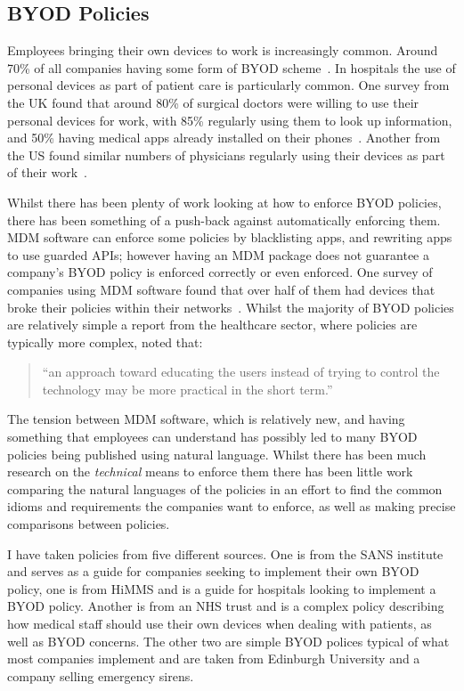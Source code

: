 \documentclass[a4paper]{scrartcl}
\begin{document}
\subsection{BYOD Policies}
\label{sec:byod}

Employees bringing their own devices to work is increasingly common. Around 70\%
of all companies having some form of \ac{BYOD} scheme~\cite{schulze_byod_2016}.
In hospitals the use of personal devices as part of patient care is particularly
common. One survey from the UK found that around 80\% of surgical doctors were
willing to use their personal devices for work, with 85\% regularly using them
to look up information, and 50\% having medical apps already installed on their
phones~\cite{patel_uk_2015}. Another from the US found similar numbers of
physicians regularly using their devices as part of their
work~\cite{moyer_managing_2013}.

Whilst there has been plenty of work looking at how to enforce BYOD policies,
there has been something of a push-back against automatically enforcing them.
\ac{MDM} software can enforce some policies by blacklisting apps, and rewriting
apps to use guarded APIs; however having an \ac{MDM} package does not guarantee a
company's BYOD policy is enforced correctly or even enforced.  One survey of
companies using \ac{MDM} software found that over half of them had devices that
broke their policies within their
networks~\cite{mobileiron_security_labs_q4_2015}.
Whilst the majority of BYOD policies are relatively simple a report from the
healthcare sector, where policies are typically more complex, noted that:
\begin{quote}
  ``an approach toward educating the users instead of trying to control the
  technology may be more practical in the short term.''~\cite{moyer_managing_2013}
\end{quote}

The tension between \ac{MDM} software, which is relatively new, and having
something that employees can understand has possibly led to many BYOD policies
being published using natural language.  Whilst there has been much research on
the \emph{technical} means to enforce them there has been little work comparing
the natural languages of the policies in an effort to find the common idioms and
requirements the companies want to enforce, as well as making precise
comparisons between policies.

I have taken policies from five different sources.  One is from the SANS
institute and serves as a guide for companies seeking to implement their own
BYOD policy, one is from HiMMS and is a guide for hospitals looking to implement
a BYOD policy.  Another is from an NHS trust and is a complex policy describing
how medical staff should use their own devices when dealing with patients, as
well as BYOD concerns.  The other two are simple BYOD polices typical of what
most companies implement and are taken from Edinburgh University and a company
selling emergency sirens.
\end{document}
